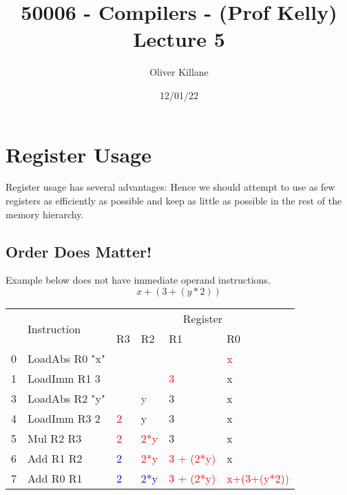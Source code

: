 \documentclass{report}
\title{50006 - Compilers - (Prof Kelly) Lecture 5}
\author{Oliver Killane}
\date{12/01/22}
\newcommand{\hot}[1]{\textcolor{red}{#1}}
\newcommand{\old}[1]{\textcolor{blue}{#1}}
\begin{document}
\maketitle

\section*{Register Usage}
Register usage has several advantages:
Hence we should attempt to use as few registers as efficiently as possible and keep as little as possible in the rest of the memory hierarchy.

\subsection*{Order Does Matter!}
Example below does not have immediate operand instructions.
\[x + (3 + (y * 2))\]
\begin{center}
	\begin{tabular}{c l | l l l l}
		  & \multirow{2}{*}{Instruction} & \multicolumn{4}{c}{Register}                                                   \\
		  &                              & R3                           & R2        & R1              & R0                \\
		\hline
		0 & LoadAbs R0 "x"               &                              &           &                 & \hot{x}           \\
		1 & LoadImm R1 3                 &                              &           & \hot{3}         & x                 \\
		3 & LoadAbs R2 "y"               &                              & \hot{y}   & 3               & x                 \\
		4 & LoadImm R3 2                 & \hot{2}                      & y         & 3               & x                 \\
		5 & Mul R2 R3                    & \hot{2}                      & \hot{2*y} & 3               & x                 \\
		6 & Add R1 R2                    & \old{2}                      & \hot{2*y} & \hot{3 + (2*y)} & x                 \\
		7 & Add R0 R1                    & \old{2}                      & \old{2*y} & \hot{3 + (2*y)} & \hot{x+(3+(y*2))} \\
	\end{tabular}
\end{center}
\end{document}
